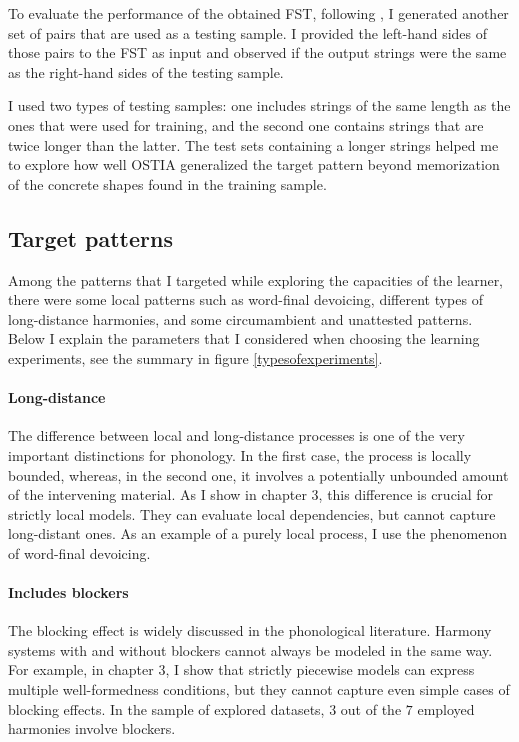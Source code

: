 To evaluate the performance of the obtained FST, following \cite{GildeaJurafsky1996}, I generated another set of pairs that are used as a testing sample.
I provided the left-hand sides of those pairs to the FST as input and observed if the output strings were the same as the right-hand sides of the testing sample.

I used two types of testing samples: one includes strings of the same length as the ones that were used for training, and the second one contains strings that are twice longer than the latter.
The test sets containing a longer strings helped me to explore how well OSTIA generalized the target pattern beyond memorization of the concrete shapes found in the training sample.


\subsection{Target patterns}

Among the patterns that I targeted while exploring the capacities of the learner, there were some local patterns such as word-final devoicing, different types of long-distance harmonies, and some circumambient and unattested patterns.
Below I explain the parameters that I considered when choosing the learning experiments, see the summary in figure \ref{typesofexperiments}.

\paragraph{Long-distance}
The difference between local and long-distance processes is one of the very important distinctions for phonology.
In the first case, the process is locally bounded, whereas, in the second one, it involves a potentially unbounded amount of the intervening material.
As I show in chapter 3, this difference is crucial for strictly local models.
They can evaluate local dependencies, but cannot capture long-distant ones.
As an example of a purely local process, I use the phenomenon of word-final devoicing.

\paragraph{Includes blockers}
The blocking effect is widely discussed in the phonological literature.
Harmony systems with and without blockers cannot always be modeled in the same way.
For example, in chapter 3, I show that strictly piecewise models can express multiple well-formedness conditions, but they cannot capture even simple cases of blocking effects.
In the sample of explored datasets, $3$ out of the $7$ employed harmonies involve blockers.

